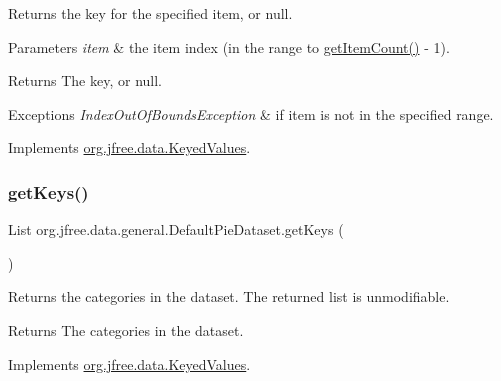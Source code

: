 Returns the key for the specified item, or {\ttfamily null}.


\begin{DoxyParams}{Parameters}
{\em item} & the item index (in the range {} to {\ttfamily \mbox{\hyperlink{classorg_1_1jfree_1_1data_1_1general_1_1_default_pie_dataset_a4cf186a9f52bd58498c9f8551f0b5957}{get\+Item\+Count()}} -\/ 1}).\\
\hline
\end{DoxyParams}
\begin{DoxyReturn}{Returns}
The key, or {\ttfamily null}.
\end{DoxyReturn}

\begin{DoxyExceptions}{Exceptions}
{\em Index\+Out\+Of\+Bounds\+Exception} & if {\ttfamily item} is not in the specified range. \\
\hline
\end{DoxyExceptions}


Implements \mbox{\hyperlink{interfaceorg_1_1jfree_1_1data_1_1_keyed_values_a830386de8513342d99845bbd9cb57bc4}{org.\+jfree.\+data.\+Keyed\+Values}}.

\mbox{\label{classorg_1_1jfree_1_1data_1_1general_1_1_default_pie_dataset_a4e5eb908e2e2005625ff71f85ebad97a}} 
\subsubsection{\texorpdfstring{get\+Keys()}{getKeys()}}
{\footnotesize\ttfamily List org.\+jfree.\+data.\+general.\+Default\+Pie\+Dataset.\+get\+Keys (\begin{DoxyParamCaption}{ }\end{DoxyParamCaption})}

Returns the categories in the dataset. The returned list is unmodifiable.

\begin{DoxyReturn}{Returns}
The categories in the dataset. 
\end{DoxyReturn}


Implements \mbox{\hyperlink{interfaceorg_1_1jfree_1_1data_1_1_keyed_values_a5bc1316f3c71eeaa6e38effe4ea660d5}{org.\+jfree.\+data.\+Keyed\+Values}}.


